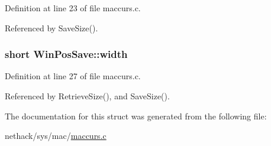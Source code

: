 Definition at line 23 of file maccurs.\+c.



Referenced by Save\+Size().

\hypertarget{structWinPosSave_aa7a3f1531159d0341e13b9b46c76747c}{
\subsubsection[{width}]{\setlength{\rightskip}{0pt plus 5cm}short Win\+Pos\+Save\+::width}}\label{structWinPosSave_aa7a3f1531159d0341e13b9b46c76747c}


Definition at line 27 of file maccurs.\+c.



Referenced by Retrieve\+Size(), and Save\+Size().



The documentation for this struct was generated from the following file\+:\begin{DoxyCompactItemize}
\item 
nethack/sys/mac/\hyperlink{maccurs_8c}{maccurs.\+c}\end{DoxyCompactItemize}
